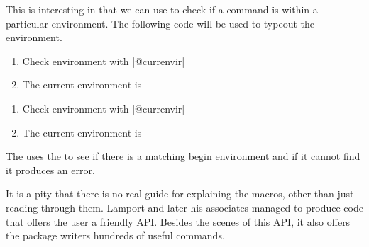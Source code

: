 This is interesting in that we can use  to check if a command is within a particular environment. The following code will be used to typeout the environment.

\begin{teX}
\begin{enumerate}
   \item Check environment with |@currenvir|
   \makeatletter
   \item The current environment is \@currenvir
   \makeatother
\end{enumerate} 
\end{teX}

\begin{enumerate}
\item Check environment with |@currenvir|
\makeatletter
 \item The current environment is \@currenvir
\makeatother
\end{enumerate}

The   uses the  to see if there is a matching
begin environment and if it cannot find it produces an error.

\begin{teX}
\def\@checkend#1{%
   \def\reserved@a{#1}
   \ifx\reserved@a\@currenvir 
   \else
     \@badend{#1}
   \fi
}
\end{teX}

It is a pity that there is no real guide for explaining the \latex macros, other than just reading through them. Lamport and later his associates managed to produce code that offers the user a friendly API. Besides the scenes of this API, it also offers the package writers hundreds of useful commands.





